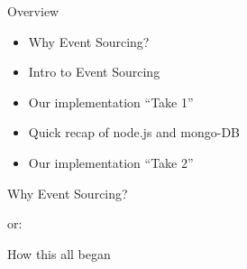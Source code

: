 \begin{frame}[fragile]{Overview}

\begin{itemize}
\item Why Event Sourcing?
\item Intro to Event Sourcing
\item Our implementation ``Take 1''
\item Quick recap of node.js and mongo-DB
\item Our implementation ``Take 2''
\end{itemize}

\end{frame}

\begin{frame}[fragile]{}

\begin{center}
{
\LARGE
Why Event Sourcing?
}

\vspace{2em}

or:

\vspace{2em}

{
\Large
How this all began
}
\end{center}
\end{frame}


